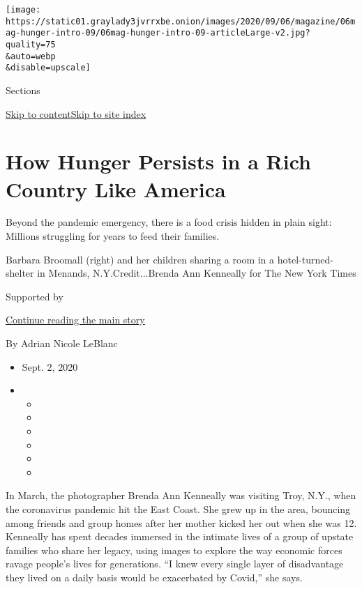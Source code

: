 \texttt{[image: https://static01.graylady3jvrrxbe.onion/images/2020/09/06/magazine/06mag-hunger-intro-09/06mag-hunger-intro-09-articleLarge-v2.jpg?quality=75\\\&auto=webp\\\&disable=upscale]}

Sections

\protect\hyperlink{site-content}{Skip to
content}\protect\hyperlink{site-index}{Skip to site index}

\hypertarget{how-hunger-persists-in-a-rich-country-like-america}{%
\section{How Hunger Persists in a Rich Country Like
America}\label{how-hunger-persists-in-a-rich-country-like-america}}

Beyond the pandemic emergency, there is a food crisis hidden in plain
sight: Millions struggling for years to feed their families.

Barbara Broomall (right) and her children sharing a room in a
hotel-turned-shelter in Menands, N.Y.Credit...Brenda Ann Kenneally for
The New York Times

Supported by

\protect\hyperlink{after-sponsor}{Continue reading the main story}

By Adrian Nicole LeBlanc

\begin{itemize}
\item
  Sept. 2, 2020
\item
  \begin{itemize}
  \item
  \item
  \item
  \item
  \item
  \item
  \end{itemize}
\end{itemize}

In March, the photographer Brenda Ann Kenneally was visiting Troy, N.Y.,
when the coronavirus pandemic hit the East Coast. She grew up in the
area, bouncing among friends and group homes after her mother kicked her
out when she was 12. Kenneally has spent decades immersed in the
intimate lives of a group of upstate families who share her legacy,
using images to explore the way economic forces ravage people's lives
for generations. ``I knew every single layer of disadvantage they lived
on a daily basis would be exacerbated by Covid,'' she says.

